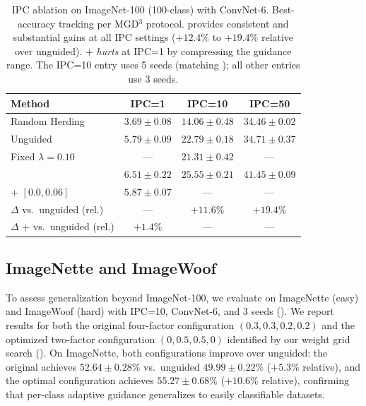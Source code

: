 \begin{table}[t]
\centering
\caption{IPC ablation on ImageNet-100 (100-class) with ConvNet-6. Best-accuracy tracking per MGD$^3$ protocol. \cags{} provides consistent and substantial gains at all IPC settings ($+12.4\%$ to $+19.4\%$ relative over unguided). \iast{}+\cags{} \emph{hurts} at IPC=1 by compressing the guidance range. The IPC=10 \cags{} entry uses 5 seeds (matching ); all other entries use 3 seeds.}
\label{tab:ipc-ablation-100cls}
\begin{tabular}{lccc}
\toprule
\textbf{Method} & \textbf{IPC=1} & \textbf{IPC=10} & \textbf{IPC=50} \\
\midrule
Random Herding & $3.69 \pm 0.08$ & $14.06 \pm 0.48$ & $34.46 \pm 0.02$ \\
Unguided & $5.79 \pm 0.09$ & $22.79 \pm 0.18$ & $34.71 \pm 0.37$ \\
Fixed $\lambda = 0.10$ & --- & $21.31 \pm 0.42$ & --- \\
\cags{} & $\mathbf{6.51 \pm 0.22}$ & $\mathbf{25.55 \pm 0.21}$ & $\mathbf{41.45 \pm 0.09}$ \\
\iast{}+\cags{} $[0.0, 0.06]$ & $5.87 \pm 0.07$ & --- & --- \\
\midrule
$\Delta$ \cags{} vs.\ unguided (rel.) & --- & $+11.6\%$ & $+19.4\%$ \\
$\Delta$ \iast{}+\cags{} vs.\ unguided (rel.) & $+1.4\%$ & --- & --- \\
\bottomrule
\end{tabular}
\end{table}

\subsection{ImageNette and ImageWoof}
\label{sec:results-nette-woof}

To assess generalization beyond ImageNet-100, we evaluate on ImageNette (easy) and ImageWoof (hard) with IPC=10, ConvNet-6, and 3 seeds (). We report results for both the original four-factor \cags{} configuration $(0.3, 0.3, 0.2, 0.2)$ and the optimized two-factor configuration $(0, 0.5, 0.5, 0)$ identified by our weight grid search (). On ImageNette, both configurations improve over unguided: the original \cags{} achieves $52.64 \pm 0.28\%$ vs.\ unguided $49.99 \pm 0.22\%$ ($+5.3\%$ relative), and the optimal configuration achieves $55.27 \pm 0.68\%$ ($+10.6\%$ relative), confirming that per-class adaptive guidance generalizes to easily classifiable datasets.

